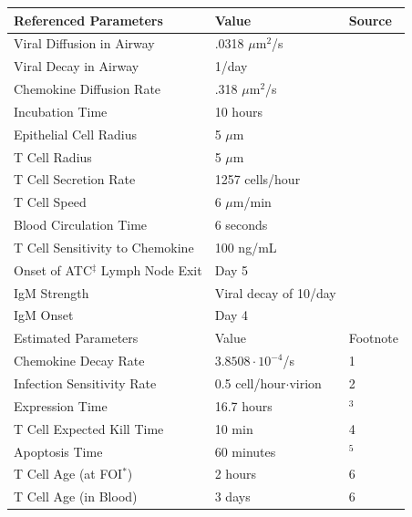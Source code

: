 \documentclass[10pt]{article}
\begin{document}
\begin{table}
\begin{center}
\begin{tabular}{| l l l |}
  \hline                        
  Referenced Parameters & Value & Source \\
  \hline
  Viral Diffusion in Airway & .0318 $\mu$m$^2$/s & \cite{Beauchemin2006} \\
  Viral Decay in Airway &  1/day & \cite{Lee2009} \\
  Chemokine Diffusion Rate & .318 $\mu$m$^2$/s & \cite{Beauchemin2006} \\
  Incubation Time &  10 hours & \cite{Mitchell2011} \\
  Epithelial Cell Radius & 5 $\mu$m & \cite{Elbert1999} \\
  T Cell Radius & 5 $\mu$m & \cite{abbas2011cellular} \\
  T Cell Secretion Rate & 1257 cells/hour & \cite{Miao2010} \\ 
  T Cell Speed & 6 $\mu$m/min & \cite{Egen2011} \\
  Blood Circulation Time & 6 seconds & \cite{Banerjee2010b} \\
  T Cell Sensitivity to Chemokine & 100 ng/mL & \cite{Nandagopal2011} \\
  Onset of ATC$^\ddagger$ Lymph Node Exit & Day 5 & \cite{Banerjee2011} \\
  IgM Strength & Viral decay of 10/day & \cite{Diamond2003} \\
  IgM Onset & Day 4 & \cite{Diamond2003} \\
  \hline
  \hline                        
  Estimated Parameters & Value & Footnote \\
  \hline
  Chemokine Decay Rate & $3.8508\cdot10^{-4}$/s & 1\\
  Infection Sensitivity Rate & 0.5 cell/hour$\cdot$virion &  2 \\
  Expression Time & 16.7 hours & \cite{Mitchell2011}$^3$ \\
  T Cell Expected Kill Time & 10 min & 4 \\
  Apoptosis Time & 60 minutes & \cite{Ganusov2008}$^5$ \\
  T Cell Age (at FOI$^\ast$) & 2 hours & 6 \\
  T Cell Age (in Blood) & 3 days & 6 \\
  \hline  
\end{tabular}

\end{center}
\end{table}
\end{document}
